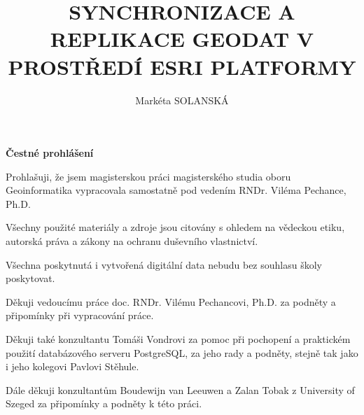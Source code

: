 \documentclass{thesisKGI}
\title{SYNCHRONIZACE A REPLIKACE GEODAT V PROSTŘEDÍ ESRI PLATFORMY}
\author{Markéta SOLANSKÁ}
\begin{document}
    \sloppy       %
    \maketitle    %


    \begin{declaration}
      \textbf{Čestné prohlášení}

      Prohlašuji, že jsem magisterskou práci magisterského studia oboru Geoinformatika vypracovala samostatně pod vedením RNDr. Viléma Pechance, Ph.D.

      Všechny použité materiály a zdroje jsou citovány s ohledem na vědeckou etiku, autorská práva a zákony na ochranu duševního vlastnictví.

      Všechna poskytnutá i vytvořená digitální data nebudu bez souhlasu školy poskytovat.
    \end{declaration}

    
    \begin{dedication}

      Děkuji vedoucímu práce doc. RNDr. Vilému Pechancovi, Ph.D. za podněty a připomínky při vypracování práce.

      Děkuji také konzultantu Tomáši Vondrovi za pomoc při pochopení a praktickém použití databázového serveru PostgreSQL, za jeho rady a podněty, stejně tak jako i jeho kolegovi Pavlovi Stěhule.

      Dále děkuji konzultantům Boudewijn van Leeuwen a Zalan Tobak z University of Szeged za připomínky a podněty k této práci. 
      \vspace{4em}
    \end{dedication}

    
    \setcounter{page}{5}          %
\end{document}
